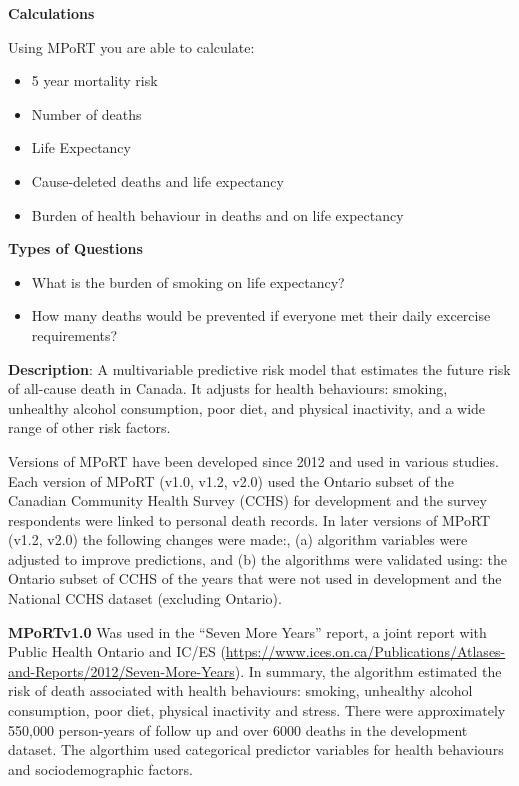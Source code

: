 \documentclass[]{book}
\providecommand{\tightlist}{%
  \setlength{\itemsep}{0pt}\setlength{\parskip}{0pt}}
\begin{document}
\textbf{Calculations}

Using MPoRT you are able to calculate:

\begin{itemize}
\tightlist
\item
  5 year mortality risk
\item
  Number of deaths
\item
  Life Expectancy
\item
  Cause-deleted deaths and life expectancy
\item
  Burden of health behaviour in deaths and on life expectancy
\end{itemize}

\textbf{Types of Questions}

\begin{itemize}
\tightlist
\item
  What is the burden of smoking on life expectancy?
\item
  How many deaths would be prevented if everyone met their daily
  excercise requirements?
\end{itemize}

\textbf{Description}: A multivariable predictive risk model that
estimates the future risk of all-cause death in Canada. It adjusts for
health behaviours: smoking, unhealthy alcohol consumption, poor diet,
and physical inactivity, and a wide range of other risk factors.

Versions of MPoRT have been developed since 2012 and used in various
studies. Each version of MPoRT (v1.0, v1.2, v2.0) used the Ontario
subset of the Canadian Community Health Survey (CCHS) for development
and the survey respondents were linked to personal death records. In
later versions of MPoRT (v1.2, v2.0) the following changes were made:,
(a) algorithm variables were adjusted to improve predictions, and (b)
the algorithms were validated using: the Ontario subset of CCHS of the
years that were not used in development and the National CCHS dataset
(excluding Ontario).

\textbf{MPoRTv1.0} Was used in the ``Seven More Years'' report, a joint
report with Public Health Ontario and IC/ES
(\url{https://www.ices.on.ca/Publications/Atlases-and-Reports/2012/Seven-More-Years}).
In summary, the algorithm estimated the risk of death associated with
health behaviours: smoking, unhealthy alcohol consumption, poor diet,
physical inactivity and stress. There were approximately 550,000
person-years of follow up and over 6000 deaths in the development
dataset. The algorthim used categorical predictor variables for health
behaviours and sociodemographic factors.
\end{document}
